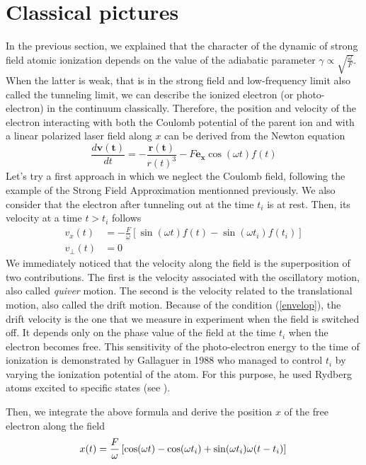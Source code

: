 \documentclass[a4paper]{article}
\begin{document}
\section{Classical pictures}

In the previous section, we explained that the character of the dynamic of strong field atomic ionization depends on the value of the adiabatic parameter $\gamma \propto \sqrt{\frac{\omega}{F}}$. When the latter is weak, that is in the strong field and low-frequency limit also called the tunneling limit, we can describe the ionized electron (or photo-electron) in the continuum classically. Therefore, the position and velocity of the electron interacting with both the Coulomb potential of the parent ion and with a linear polarized laser field along $x$ can be derived from the Newton equation
\begin{equation}
\frac{d \mathbf{v(t)}}{dt}=-\frac{\mathbf{r(t)}}{r(t)^{3}}-F\mathbf{e_{x}}\cos(\omega t) f(t) 
\end{equation}
Let's try a first approach in which we neglect the Coulomb field, following the example of the Strong Field Approximation mentionned previously. We also consider that the electron after tunneling out at the time $t_{i}$ is at rest. Then, its velocity at a time $t>t_{i}$ follows
\begin{align}
\label{velocity_free_motion}
v_{x}(t)&=-\frac{F}{\omega}\left[\sin(\omega t) f(t)-\sin(\omega t_{i}) f(t_{i})\right] \\
v_{\perp}(t)&=0
\end{align}
We immediately noticed that the velocity along the field is the superposition of two contributions. The first is the velocity associated with the oscillatory motion, also called \textit{quiver} motion. The second is the velocity related to the translational motion, also called the drift motion. Because of the condition (\ref{envelop}), the drift velocity is the one that we measure in experiment when the field is switched off. It depends only on the phase value of the field at the time $t_{i}$ when the electron becomes free. This sensitivity of the photo-electron energy to the time of ionization is demonstrated by Gallaguer in 1988 who managed to control $t_{i}$ by varying the ionization potential of the atom. For this purpose, he used Rydberg atoms excited to specific states (see \cite{Gallagher_1988}).
\par
Then, we integrate the above formula and derive the position $x$ of the free electron along the field
\begin{equation}
\label{position_free_motion}
x(t)=\frac{F}{\omega}\left[\cos(\omega t)-\cos(\omega t_{i})+\sin(\omega t_{i})\omega(t-t_{i})\right] \\
\end{equation}
\end{document}

